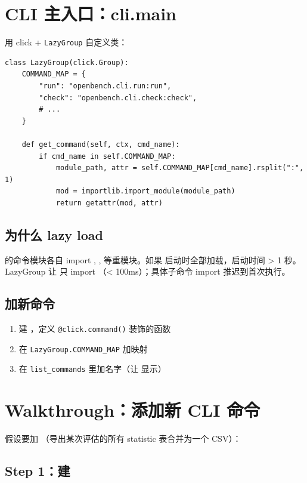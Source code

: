 \section{CLI 主入口：cli.main}

 用 click + \texttt{LazyGroup} 自定义类：

\begin{verbatim}
class LazyGroup(click.Group):
    COMMAND_MAP = {
        "run": "openbench.cli.run:run",
        "check": "openbench.cli.check:check",
        # ...
    }

    def get_command(self, ctx, cmd_name):
        if cmd_name in self.COMMAND_MAP:
            module_path, attr = self.COMMAND_MAP[cmd_name].rsplit(":", 1)
            mod = importlib.import_module(module_path)
            return getattr(mod, attr)
\end{verbatim}

\subsection{为什么 lazy load}

\openbench{} 的命令模块各自 import , ,  等重模块。如果  启动时全部加载，启动时间 > 1 秒。LazyGroup 让  只 import （< 100ms）；具体子命令 import 推迟到首次执行。

\subsection{加新命令}

\begin{enumerate}
  \item 建 ，定义 \texttt{@click.command()} 装饰的函数
  \item 在 \texttt{LazyGroup.COMMAND\_MAP} 加映射
  \item 在 \texttt{list\_commands} 里加名字（让  显示）
\end{enumerate}

\section{Walkthrough：添加新 CLI 命令}

假设要加 （导出某次评估的所有 statistic 表合并为一个 CSV）：

\subsection{Step 1：建 }

